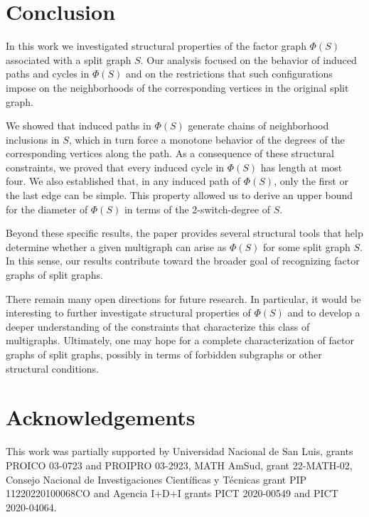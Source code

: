 \documentclass[11pt]{elsarticle}
\begin{document}
\section{Conclusion}\label{sec_conclusion}

In this work we investigated structural properties of the factor graph $\Phi(S)$ associated with a split graph $S$. Our analysis focused on the behavior of induced paths and cycles in $\Phi(S)$ and on the restrictions that such configurations impose on the neighborhoods of the corresponding vertices in the original split graph.

We showed that induced paths in $\Phi(S)$ generate chains of neighborhood inclusions in $S$, which in turn force a monotone behavior of the degrees of the corresponding vertices along the path. As a consequence of these structural constraints, we proved that every induced cycle in $\Phi(S)$ has length at most four. We also established that, in any induced path of $\Phi(S)$, only the first or the last edge can be simple. This property allowed us to derive an upper bound for the diameter of $\Phi(S)$ in terms of the 2-switch-degree of $S$.

Beyond these specific results, the paper provides several structural tools that help determine whether a given multigraph can arise as $\Phi(S)$ for some split graph $S$. In this sense, our results contribute toward the broader goal of recognizing factor graphs of split graphs.

There remain many open directions for future research. In particular, it would be interesting to further investigate structural properties of $\Phi(S)$ and to develop a deeper understanding of the constraints that characterize this class of multigraphs. Ultimately, one may hope for a complete characterization of factor graphs of split graphs, possibly in terms of forbidden subgraphs or other structural conditions.


\section*{Acknowledgements}
This work was partially supported by Universidad Nacional de San Luis, grants PROICO 03-0723 and PROIPRO 03-2923, MATH AmSud, grant 22-MATH-02, Consejo Nacional de Investigaciones
Cient\'ificas y T\'ecnicas grant PIP 11220220100068CO and Agencia I+D+I grants PICT 2020-00549 and PICT 2020-04064.

	

	
	
\end{document}
